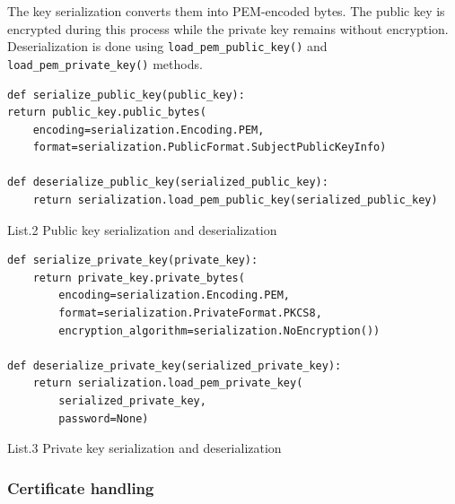 \documentclass[12pt, a4paper]{report}
\begin{document}
\vspace{4pt}

\noindent
The key serialization converts them into PEM-encoded bytes. The public key is encrypted during this process while the private key remains without encryption.
Deserialization is done using \texttt{load_pem_public_key()} and \texttt{load_pem_private_key()} methods.

\begin{verbatim}
def serialize_public_key(public_key):
return public_key.public_bytes(
    encoding=serialization.Encoding.PEM,
    format=serialization.PublicFormat.SubjectPublicKeyInfo)

def deserialize_public_key(serialized_public_key):
    return serialization.load_pem_public_key(serialized_public_key)
\end{verbatim}
\begin{center}
List.2 Public key serialization and deserialization
\end{center}

\newpage

\begin{verbatim}
def serialize_private_key(private_key):
    return private_key.private_bytes(
        encoding=serialization.Encoding.PEM,
        format=serialization.PrivateFormat.PKCS8,
        encryption_algorithm=serialization.NoEncryption())

def deserialize_private_key(serialized_private_key):
    return serialization.load_pem_private_key(
        serialized_private_key,
        password=None)
\end{verbatim}
\begin{center}
List.3 Private key serialization and deserialization
\end{center}

\subsubsection{Certificate handling}
\end{document}
